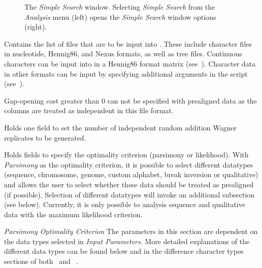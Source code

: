 \begin{figure}
\begin{minipage}[c]{0.52\textwidth}
\end{minipage}

\caption{The \emph{Simple Search} window. Selecting \emph{Simple Search} 
from the \emph{Analysis} 
menu (left) opens the \emph{Simple Search} window options (right).}
\label{fig:simple_search_window}
\end{figure}

\begin{description}
\setlength{\parindent}{0.5cm}
\item[Input Files]
Contains the list of files that are to be input into \poy. These include
character files in nucleotide, Hennig86, and Nexus formats, as well 
as tree files. Continuous characters can be input into \poy in a Hennig86 
format matrix (see~). Character data in other formats can 
be input by specifying additional arguments in the script (see~).

\begin{statement}
Gap-opening cost greater than $0$ can not be specified with 
prealigned data as the columns are treated as independent in 
this file format.
\end{statement}

\item[Search Parameters]
Holds one field to set the number of independent random addition Wagner 
replicates to be generated.

\item[Input Parameters]
Holds fields to specify the optimality criterion (parsimony or likelihood).  
With \emph{Parsimony} as the optimality criterion, it is possible to select 
different datatypes (sequence, chromosome, genome, custom alphabet, 
break inversion or qualitative) and allows the user to select whether these data 
should be treated as prealigned (if possible). Selection of different datatypes 
will invoke an additional subsection (see below).  Currently, it is only possible 
to analysis sequence and qualitative data with the maximum likelihood criterion.
\end{description}   

\hangindent=1cm	\emph{Parsimony Optimality Criterion}
The parameters in this section are dependent on the data types selected 
in \emph{Input Parameters}. More detailed explanations of the different 
data types can be found below and  in the difference character types 
sections of both~ and ~.

